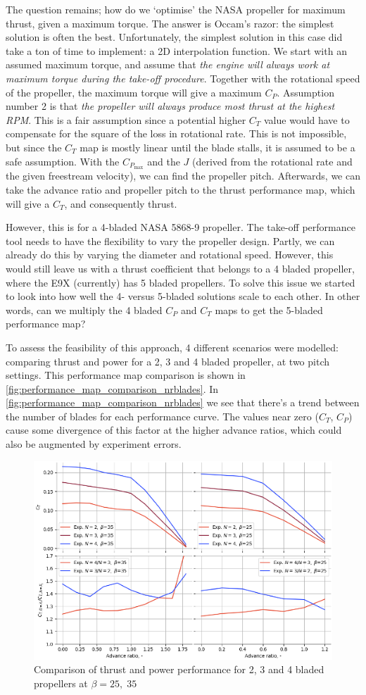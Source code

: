The question remains; how do we `optimise' the NASA propeller for maximum thrust, given a maximum torque. The answer is Occam's razor: the simplest solution is often the best. Unfortunately, the simplest solution in this case did take a ton of time to implement: a 2D interpolation function. We start with an assumed maximum torque, and assume that \textit{the engine will always work at maximum torque during the take-off procedure}. Together with the rotational speed of the propeller, the maximum torque will give a maximum $C_P$. Assumption number 2 is that \textit{the propeller will always produce most thrust at the highest RPM}. This is a fair assumption since a potential higher $C_T$ value would have to compensate for the square of the loss in rotational rate. This is not impossible, but since the $C_T$ map is mostly linear until the blade stalls, it is assumed to be a safe assumption. With the $C_{P_\text{max}}$ and the $J$ (derived from the rotational rate and the given freestream velocity), we can find the propeller pitch. Afterwards, we can take the advance ratio and propeller pitch to the thrust performance map, which will give a $C_T$, and consequently thrust.

However, this is for a 4-bladed NASA 5868-9 propeller. The take-off performance tool needs to have the flexibility to vary the propeller design. Partly, we can already do this by varying the diameter and rotational speed. However, this would still leave us with a thrust coefficient that belongs to a 4 bladed propeller, where the E9X (currently) has 5 bladed propellers. To solve this issue we started to look into how well the 4- versus 5-bladed solutions scale to each other. In other words, can we multiply the 4 bladed $C_P$ and $C_T$ maps to get the 5-bladed performance map?

To assess the feasibility of this approach, 4 different scenarios were modelled: comparing thrust and power for a 2, 3 and 4 bladed propeller, at two pitch settings. This performance map comparison is shown in \autoref{fig:performance_map_comparison_nrblades}. In \autoref{fig:performance_map_comparison_nrblades} we see that there's a trend between the number of blades for each performance curve. The values near zero ($C_T$, $C_P$) cause some divergence of this factor at the higher advance ratios, which could also be augmented by experiment errors.

\begin{figure}[!ht]
    \centering
    \includegraphics[width=0.5\linewidth]{figures/performancemap_comparison.png}
    \caption{Comparison of thrust and power performance for 2, 3 and 4 bladed propellers at $\beta=25,\;35$}
    \label{fig:performance_map_comparison_nrblades}
\end{figure}

